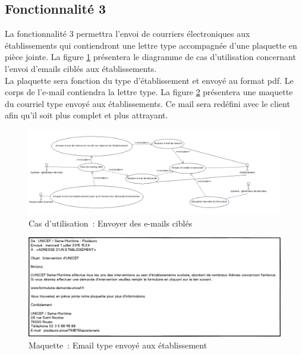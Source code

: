 \newpage
\subsection{Fonctionnalité 3}
La fonctionnalité 3 permettra l'envoi de courriers électroniques aux établissements qui contiendront une lettre type accompagnée d'une plaquette en pièce jointe. La figure \ref{envoiMailsCibles} présentera le diagramme de cas d'utilisation concernant l'envoi d'emails ciblés aux établissements.\\
 La plaquette sera fonction du type d'établissement et envoyé au format pdf. Le corps de l'e-mail contiendra la lettre type. La figure \ref{fonctionnalite3MailType} présentera une maquette du courriel type envoyé aux établissements. Ce mail sera redéfini avec le client afin qu'il soit plus complet et plus attrayant.\\


\begin{figure}[H]
	\centering
	\includegraphics[scale=0.375]{images/casDUtilisation/fonctionnalite3Mailing.png}
	 \caption{Cas d'utilisation~: Envoyer des e-mails ciblés}
	 \label{envoiMailsCibles}
\end{figure}

\begin{figure}[H]
	\centering
	\includegraphics[scale=0.57]{images/maquettes/fonctionnalite3MailType}
	\caption{Maquette~: Email type envoyé aux établissement}
	\label{fonctionnalite3MailType}
\end{figure}


